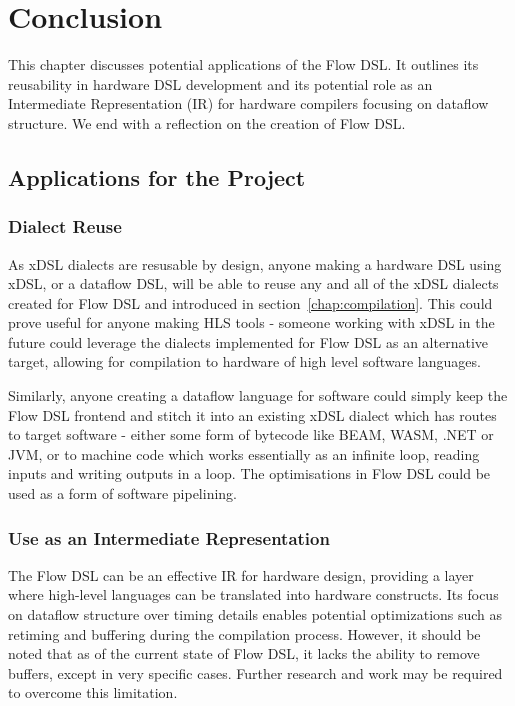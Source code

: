 \chapter{Conclusion}
This chapter discusses potential applications of the Flow DSL. It outlines its reusability in hardware DSL development and its potential role as an Intermediate Representation (IR) for hardware compilers focusing on dataflow structure. We end with a reflection on the creation of Flow DSL.

\section{Applications for the Project}
\subsection*{Dialect Reuse}
As xDSL dialects are resusable by design, anyone making a hardware DSL using xDSL, or a dataflow DSL, will be able to reuse any and all of the xDSL dialects created for Flow DSL and introduced in section \ref{chap:compilation}. This could prove useful for anyone making HLS tools \hyphen{} someone working with xDSL in the future could leverage the dialects implemented for Flow DSL as an alternative target, allowing for compilation to hardware of high level software languages.

Similarly, anyone creating a dataflow language for software could simply keep the Flow DSL frontend and stitch it into an existing xDSL dialect which has routes to target software \hyphen{} either some form of bytecode like BEAM, WASM, .NET or JVM, or to machine code which works essentially as an infinite loop, reading inputs and writing outputs in a loop. The optimisations in Flow DSL could be used as a form of software pipelining.

\subsection{Use as an Intermediate Representation}
The Flow DSL can be an effective IR for hardware design, providing a layer where high-level languages can be translated into hardware constructs. Its focus on dataflow structure over timing details enables potential optimizations such as retiming and buffering during the compilation process. However, it should be noted that as of the current state of Flow DSL, it lacks the ability to remove buffers, except in very specific cases. Further research and work may be required to overcome this limitation.

